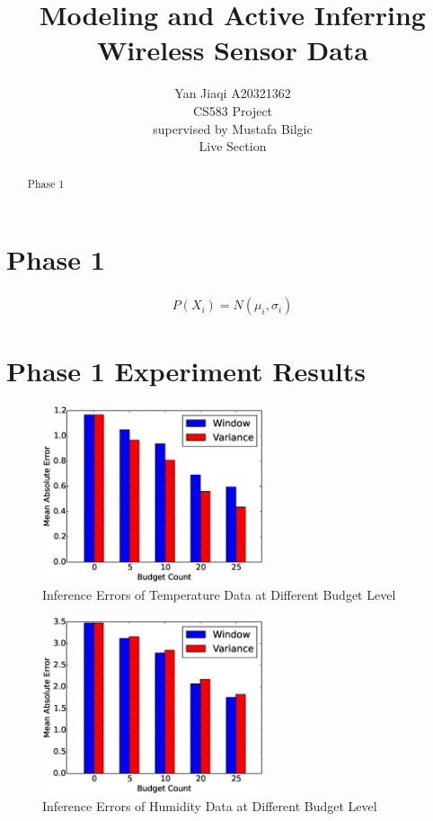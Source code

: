 \documentclass[12pt]{article}  %
\title{Modeling and Active Inferring Wireless Sensor Data}
\author{Yan Jiaqi A20321362\\
CS583 Project\\
supervised by
Mustafa Bilgic\\
Live Section
}
\theoremstyle{definition}
\theoremstyle{remark}
\begin{document}
\maketitle

\begin{abstract}
Phase 1
\end{abstract}

\newpage
\tableofcontents

\newpage

\section{Phase 1}
\begin{align}
        P(X_i) = N(\mu_i, \sigma_i)
\end{align}


\section{Phase 1 Experiment Results}
\label{sec:phase1:result}

\begin{figure}[h]
\centering
        \includegraphics[width=0.58\textwidth]{../phase1/temperature_err}
\caption{Inference Errors of Temperature Data at Different Budget Level}
\label{fig:phase1:temperature}
\end{figure}

\begin{figure}[h]
\centering
        \includegraphics[width=0.58\textwidth]{../phase1/humidity_err}
\caption{Inference Errors of Humidity Data at Different Budget Level}
\label{fig:phase1:humidity}
\end{figure}
\end{document}
